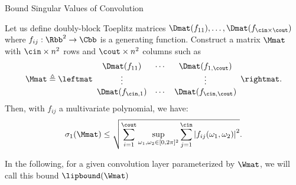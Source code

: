 \begin{frame}{Bound Singular Values of Convolution}


  \begin{theorem}
    Let us define doubly-block Toeplitz matrices $\Dmat(f_{11}), \dots, \Dmat(f_{\cin\times \cout})$ where $f_{ij}: \Rbb^2 \rightarrow \Cbb$ is a generating function. Construct a matrix $\Mmat$ with $\cin\times n^2$ rows and $\cout\times n^2$ columns such as
    {\small
    \begin{equation*}
	\Mmat \triangleq  \leftmat\begin{array}{ccc}
	\Dmat(f_{11}) & \cdots & \Dmat(f_{1,\cout})   \\
	\vdots & & \vdots   \\
	\Dmat(f_{\cin,1}) & \cdots & \Dmat(f_{\cin,\cout}) \\
	\end{array}\rightmat .
    \end{equation*}
    }
    Then, with $f_{ij}$ a multivariate polynomial, we have:
    \begin{equation*}
       \sigma_1(\Mmat) \leq \sqrt{ \sum_{i=1}^{\cout} \sup_{\omega_1, \omega_2 \in [0, 2\pi]^2} \sum_{j = 1}^{\cin} \left|f_{ij}(\omega_1, \omega_2) \right|^2 } .
    \end{equation*}
  \end{theorem}

  In the following, for a given convolution layer parameterized by $\Wmat$, we will call this bound $\lipbound(\Wmat)$

\end{frame}



